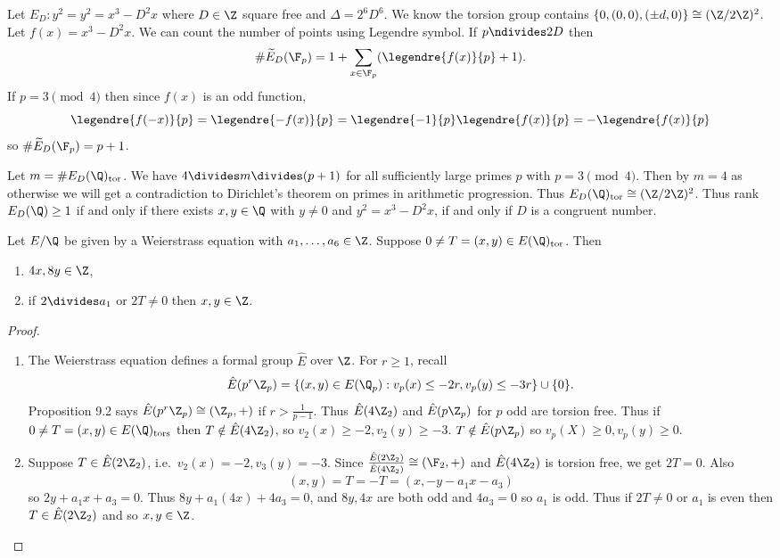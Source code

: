 \documentclass[a4paper]{article}
\theoremstyle{definition}
\begin{document}
\begin{eg}
  Let \(E_D: y^2 = y^2 = x^3 - D^2 x\) where \(D \in \Z\) square free and \(\Delta = 2^6 D^6\). We know the torsion group contains \(\{0, (0, 0), (\pm d, 0)\} \cong (\Z/2\Z)^2\). Let \(f(x) = x^3 - D^2x\). We can count the number of points using Legendre symbol. If \(p \ndivides 2D\) then
  \[
    \# \widetilde E_D(\F_p) = 1 + \sum_{x \in \F_p} (\legendre{f(x)}{p} + 1).
  \]
  If \(p = 3 \pmod 4\) then since \(f(x)\) is an odd function,
  \[
    \legendre{f(-x)}{p} = \legendre{-f(x)}{p} = \legendre{-1}{p} \legendre{f(x)}{p} = - \legendre{f(x)}{p}
  \]
  so \(\# \widetilde E_D(\F_p) = p + 1\).

  Let \(m = \# E_D(\Q)_{\mathrm{tor}}\). We have \(4 \divides m \divides (p + 1)\) for all sufficiently large primes \(p\) with \(p = 3 \pmod 4\). Then by \(m = 4\) as otherwise we will get a contradiction to Dirichlet's theorem on primes in arithmetic progression. Thus \(E_D(\Q)_{\mathrm{tor}} \cong (\Z/2\Z)^2\). Thus rank \(E_D(\Q) \geq 1\) if and only if there exists \(x, y \in \Q\) with \(y \neq 0\) and \(y^2 = x^3 - D^2x\), if and only if \(D\) is a congruent number.
\end{eg}

\begin{lemma}
  Let \(E/\Q\) be given by a Weierstrass equation with \(a_1, \dots, a_6 \in \Z\). Suppose \(0 \neq T = (x, y) \in E(\Q)_{\mathrm{tor}}\). Then
  \begin{enumerate}
  \item \(4x, 8y \in \Z\),
  \item if \(2 \divides a_1\) or \(2T \neq 0\) then \(x, y \in \Z\).
  \end{enumerate}
\end{lemma}

\begin{proof} \leavevmode
  \begin{enumerate}
  \item The Weierstrass equation defines a formal group \(\hat E\) over \(\Z\). For \(r \geq 1\), recall
    \[
      \hat E(p^r \Z_p) = \{(x, y) \in E(\Q_p): v_p(x) \leq -2r, v_p(y) \leq -3r\} \cup \{0\}.
    \]
    Proposition 9.2 says \(\hat E(p^r\Z_p) \cong (\Z_p, +)\) if \(r > \frac{1}{p - 1}\). Thus \(\hat E(4 \Z_2)\) and \(\hat E(p\Z_p)\) for \(p\) odd are torsion free. Thus if \(0 \neq T = (x, y) \in E(\Q)_{\mathrm{tors}}\) then \(T \notin \hat E(4\Z_2)\), so \(v_2(x) \geq -2, v_2(y) \geq -3\). \(T \notin \hat E(p\Z_p)\) so \(v_p(X) \geq 0, v_p(y) \geq 0\).
  \item Suppose \(T \in \hat E(2 \Z_2)\), i.e.\ \(v_2(x) = -2, v_3(y) = -3\). Since \(\frac{\hat E(2\Z_2)}{\hat E(4\Z_2)} \cong (\F_2, +)\) and \(\hat E(4\Z_2)\) is torsion free, we get \(2T = 0\). Also
    \[
      (x, y) = T = -T = (x, -y - a_1x - a_3)
    \]
    so \(2y + a_1x + a_3 = 0\). Thus \(8y + a_1 (4x) + 4a_3 = 0\), and \(8y, 4x\) are both odd and \(4a_3 = 0\) so \(a_1\) is odd. Thus if \(2T \neq 0\) or \(a_1\) is even then \(T \in \hat E(2\Z_2)\) and so \(x, y \in \Z\).
  \end{enumerate}
\end{proof}
\end{document}
